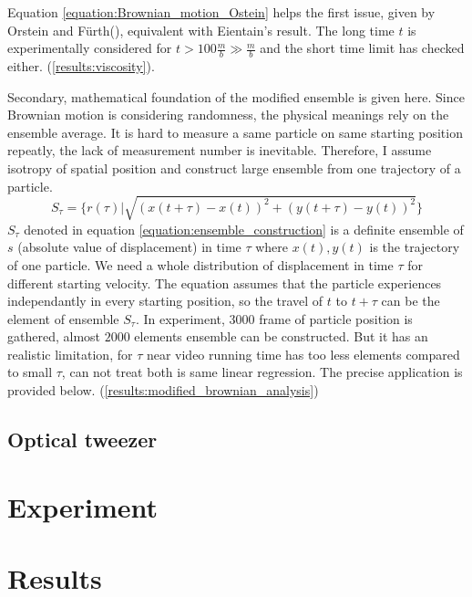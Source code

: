 \documentclass{article}
\begin{document}
Equation \ref{equation:Brownian_motion_Ostein} helps the first issue, given by Orstein and F{\"u}rth(\cite{Brownian_motion_1}), equivalent with Eientain's result.
The long time $t$ is experimentally considered for $t > 100 \frac{m}{b} \gg \frac{m}{b}$ and the short time limit has checked either. (\ref{results:viscosity}).

Secondary, mathematical foundation of the modified ensemble is given here.
Since Brownian motion is considering randomness, the physical meanings rely on the ensemble average.
It is hard to measure a same particle on same starting position repeatly, the lack of measurement number is inevitable.
Therefore, I assume isotropy of spatial position and construct large ensemble from one trajectory of a particle.
\begin{equation}
    S_\tau = \{ r(\tau)|\sqrt{(x(t+\tau)-x(t))^2+(y(t+\tau)-y(t))^2} \}
    \label{equation:ensemble_construction}
\end{equation}
$S_\tau$ denoted in equation \ref{equation:ensemble_construction} is a definite ensemble of $s$ (absolute value of displacement) in time $\tau$ where $x(t), y(t)$ is the trajectory of one particle.
We need a whole distribution of displacement in time $\tau$ for different starting velocity.
The equation assumes that the particle experiences independantly in every starting position, so the travel of $t$ to $t+\tau$ can be the element of ensemble $S_\tau$.
In experiment, $3000$ frame of particle position is gathered, almost $2000$ elements ensemble can be constructed.
But it has an realistic limitation, for $\tau$ near video running time has too less elements compared to small $\tau$, can not treat both is same linear regression.
The precise application is provided below. (\ref{results:modified_brownian_analysis})


\subsection{Optical tweezer}
\label{intro:optical_tweezer}






\section{Experiment}

\section{Results}
\end{document}
